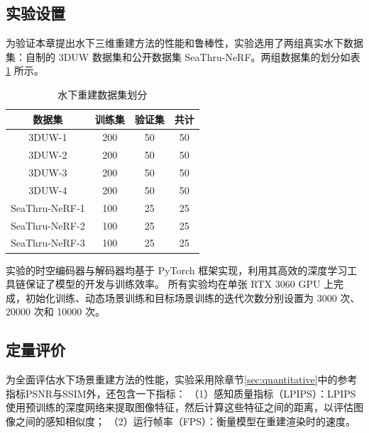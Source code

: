\subsection{实验设置}
为验证本章提出水下三维重建方法的性能和鲁棒性，实验选用了两组真实水下数据集：自制的 3DUW 数据集和公开数据集 SeaThru-NeRF\cite{seathru}。两组数据集的划分如表 \ref{tab:recondata_split} 所示。
\begin{table}[htbp]
    \centering
    \caption{水下重建数据集划分}
    \label{tab:recondata_split}
    \begin{tabular}{cccc}
        \toprule
        数据集 & 训练集 & 验证集 & 共计 \\
        \midrule
        3DUW-1 & 200 & 50 & 50 \\
        3DUW-2 & 200 & 50 & 50 \\
        3DUW-3 & 200 & 50 & 50 \\
        3DUW-4 & 200 & 50 & 50 \\
        SeaThru-NeRF-1 & 100 & 25 & 25 \\
        SeaThru-NeRF-2 & 100 & 25 & 25 \\
        SeaThru-NeRF-3 & 100 & 25 & 25 \\
        \bottomrule
    \end{tabular}
\end{table}
实验的时空编码器与解码器均基于 PyTorch 框架\cite{pytorch}实现，利用其高效的深度学习工具链保证了模型的开发与训练效率。
所有实验均在单张 RTX 3060 GPU 上完成，初始化训练、动态场景训练和目标场景训练的迭代次数分别设置为 3000 次、20000 次和 10000 次。

\subsection{定量评价}
为全面评估水下场景重建方法的性能，实验采用除章节\ref{sec:quantitative}中的参考指标PSNR与SSIM外，还包含一下指标：
（1）感知质量指标（LPIPS）\cite{lpips}：LPIPS 使用预训练的深度网络来提取图像特征，然后计算这些特征之间的距离，以评估图像之间的感知相似度；
（2）运行帧率（FPS）：衡量模型在重建渲染时的速度。

